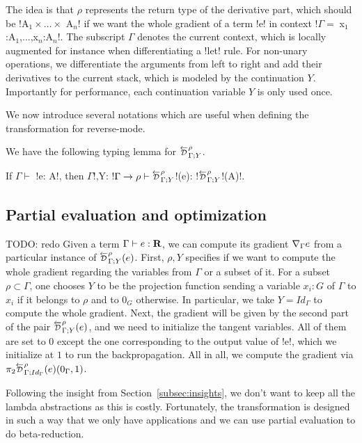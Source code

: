 The idea is that $\rho$ represents the return type of the derivative part, which should be !A$_{1} \times \ldots \times$ A$_n$! 
if we want the whole gradient of a term !e! in context !$\Gamma = \;$x$_{1}$:A$_{1}$,...,x$_n$:A$_n$!.
The subscript $\Gamma$ denotes the current context, 
which is locally augmented for instance when differentiating a !let! rule.
For non-unary operations, we differentiate the arguments from left to right and add their derivatives to the current stack, 
which is modeled by the continuation $Y$. 
Importantly for performance, each continuation variable $Y$ is only used once.

We now introduce several notations which are useful when defining the transformation for reverse-mode.



We have the following typing lemma for $\directD{\rho}{\Gamma}{Y}$.
\begin{lemma}
    If $\Gamma \vdash$ !e: A!, then $\Gamma$!,Y: !$\Gamma\to \rho \vdash \directD{\rho}{\Gamma}{Y}$!(e): !$\directD{\rho}{\Gamma}{Y}$!(A)!.
\end{lemma}



\subsection{Partial evaluation and optimization} %
\label{sub:Partial evaluation and optimization}

TODO: redo
Given a term $\Gamma\vdash e : \mathbf{R}$, we can compute its gradient $\nabla_\Gamma e$ from a particular instance of 
$\directD{\rho}{\Gamma}{Y}(e)$. First, $\rho, Y$ specifies if we want to compute the whole gradient regarding the variables from $\Gamma$ or a subset of it.
For a subset $\rho\subset \Gamma$, one chooses $Y$ to be the projection function sending a variable 
$x_i:G$ of $\Gamma$ to $x_i$ if it belongs to $\rho$ and to $0_G$ otherwise.
In particular, we take $Y=Id_\Gamma$ to compute the whole gradient.
Next, the gradient will be given by the second part of the pair $\directD{\rho}{\Gamma}{Y}(e)$, 
and we need to initialize the tangent variables. All of them are set to $0$ except the one corresponding to the output value of !e!, 
which we initialize at $1$ to run the backpropagation. 
All in all, we compute the gradient via $\pi_2\directD{\rho}{\Gamma}{Id_\Gamma}(e)(0_\Gamma,1)$.

Following the insight from Section~\ref{subsec:insights}, 
we don't want to keep all the lambda abstractions as this is costly. 
Fortunately, the transformation is designed in such a way that we only have applications 
and we can use partial evaluation to do beta-reduction. 

